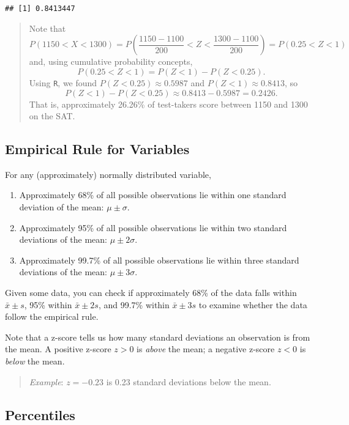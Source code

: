 \documentclass[
]{book}
\providecommand{\tightlist}{%
  \setlength{\itemsep}{0pt}\setlength{\parskip}{0pt}}
\begin{document}
\begin{verbatim}
## [1] 0.8413447
\end{verbatim}

\begin{quote}
Note that \[P(1150 < X < 1300) = P\left(\frac{1150-1100}{200} < Z < \frac{1300-1100}{200}\right) = P(0.25 < Z < 1)\] and, using cumulative probability concepts, \[P(0.25 < Z < 1) = P(Z < 1) - P(Z < 0.25).\] Using \texttt{R}, we found \(P(Z < 0.25) \approx 0.5987\) and \(P(Z < 1) \approx 0.8413\), so \[P(Z < 1) - P(Z < 0.25) \approx 0.8413 - 0.5987 = 0.2426.\] That is, approximately 26.26\% of test-takers score between 1150 and 1300 on the SAT.
\end{quote}

\hypertarget{empirical-rule-for-variables}{%
\subsection{Empirical Rule for Variables}\label{empirical-rule-for-variables}}

For any (approximately) normally distributed variable,

\begin{enumerate}
\def\labelenumi{\arabic{enumi}.}
\tightlist
\item
  Approximately 68\% of all possible observations lie within one standard deviation of the mean: \(\mu \pm \sigma.\)
\item
  Approximately 95\% of all possible observations lie within two standard deviations of the mean: \(\mu \pm 2\sigma.\)
\item
  Approximately 99.7\% of all possible observations lie within three standard deviations of the mean: \(\mu \pm 3\sigma.\)
\end{enumerate}

Given some data, you can check if approximately 68\% of the data falls within \(\bar{x}\pm s\), 95\% within \(\bar{x}\pm 2s\), and 99.7\% within \(\bar{x}\pm 3s\) to examine whether the data follow the empirical rule.

Note that a z-score tells us how many standard deviations an observation is from the mean. A positive z-score \(z>0\) is \emph{above} the mean; a negative z-score \(z<0\) is \emph{below} the mean.

\begin{quote}
\emph{Example}: \(z=-0.23\) is 0.23 standard deviations below the mean.
\end{quote}

\hypertarget{percentiles}{%
\subsection{Percentiles}\label{percentiles}}
\end{document}
